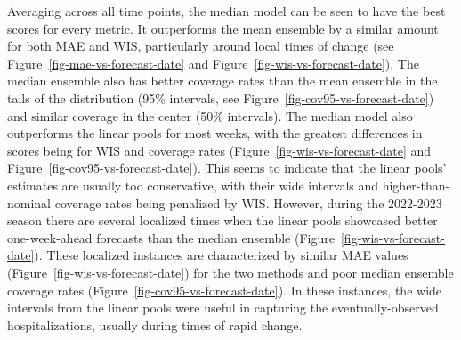 \documentclass[
  article,
  shortnames,
  notitle]{jss}
\begin{document}
Averaging across all time points, the median model can be seen to have
the best scores for every metric. It outperforms the mean ensemble by a
similar amount for both MAE and WIS, particularly around local times of
change (see Figure~\ref{fig-mae-vs-forecast-date} and
Figure~\ref{fig-wis-vs-forecast-date}). The median ensemble also has
better coverage rates than the mean ensemble in the tails of the
distribution (95\% intervals, see
Figure~\ref{fig-cov95-vs-forecast-date}) and similar coverage in the
center (50\% intervals). The median model also outperforms the linear
pools for most weeks, with the greatest differences in scores being for
WIS and coverage rates (Figure~\ref{fig-wis-vs-forecast-date} and
Figure~\ref{fig-cov95-vs-forecast-date}). This seems to indicate that
the linear pools' estimates are usually too conservative, with their
wide intervals and higher-than-nominal coverage rates being penalized by
WIS. However, during the 2022-2023 season there are several localized
times when the linear pools showcased better one-week-ahead forecasts
than the median ensemble (Figure~\ref{fig-wis-vs-forecast-date}). These
localized instances are characterized by similar MAE values
(Figure~\ref{fig-wis-vs-forecast-date}) for the two methods and poor
median ensemble coverage rates
(Figure~\ref{fig-cov95-vs-forecast-date}). In these instances, the wide
intervals from the linear pools were useful in capturing the
eventually-observed hospitalizations, usually during times of rapid
change.
\end{document}
